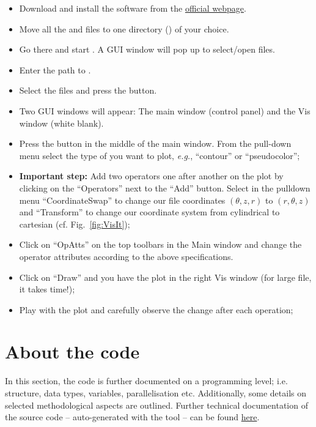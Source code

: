 \documentclass[a4paper, 11pt, DIV=11]{scrartcl}
\begin{document}
\begin{itemize}
\item Download and install the software from the \href{https://wci.llnl.gov/simulation/computer-codes/visit}{official webpage}.
\item Move all the  and  files to one directory () of your choice.
\item Go there and start \visit. A GUI window will pop up to select/open files.
\item Enter the path to .
\item Select the  files and press the  button.
\item Two GUI windows will appear: The \visit main window (control panel) and the Vis window (white blank).
\item Press the  button in the middle of the main window. From the
pull-down menu select the type of you want to plot, \textit{e.g.}, ``contour'' or ``pseudocolor'';
  \item  \textbf{Important step:} Add two operators one after another on the plot by clicking on the ``Operators'' next to the ``Add'' button. 
 Select in the pulldown menu ``CoordinateSwap'' to change our file coordinates $(\theta,z,r)$ to $(r,\theta,z)$ 
 and ``Transform'' to change our coordinate system from
 cylindrical to cartesian (cf. Fig.~\ref{fig:VisIt}); 
  \item  Click on ``OpAtts'' on the top toolbars in the Main window and change the operator attributes according to the above specifications.
  \item  Click on ``Draw'' and you have the plot in the right Vis window (for large file, it takes time!);
  \item  Play with the plot and carefully observe the change after each operation;
\end{itemize} 

\section{About the code}
\label{sec:aboutTheCode}

In this section, the code is further documented on a programming level;
i.e. structure, data types, variables, parallelisation etc. Additionally,
some details on selected methodological aspects are outlined. Further
technical documentation of the source code -- auto-generated with the
 tool -- can be found
\href{http://mjr.pages.mpcdf.de/nscouette/ford-doc/}{here}.
\end{document}

